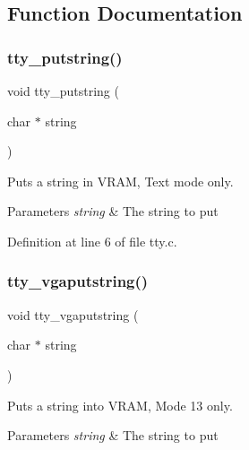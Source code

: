 \subsection{Function Documentation}
\mbox{\label{a00032_a2ebb962f457a2677d70285d1c0f9be12_a2ebb962f457a2677d70285d1c0f9be12}} 
\subsubsection{\texorpdfstring{tty\+\_\+putstring()}{tty\_putstring()}}
{\footnotesize\ttfamily void tty\+\_\+putstring (\begin{DoxyParamCaption}\item[{char $\ast$}]{string }\end{DoxyParamCaption})}



Puts a string in V\+R\+AM, Text mode only. 


\begin{DoxyParams}{Parameters}
{\em string} & The string to put \\
\hline
\end{DoxyParams}


Definition at line 6 of file tty.\+c.

\mbox{\label{a00032_a13ff2c06d56753c5666ca56cb2d81100_a13ff2c06d56753c5666ca56cb2d81100}} 
\subsubsection{\texorpdfstring{tty\+\_\+vgaputstring()}{tty\_vgaputstring()}}
{\footnotesize\ttfamily void tty\+\_\+vgaputstring (\begin{DoxyParamCaption}\item[{char $\ast$}]{string }\end{DoxyParamCaption})}



Puts a string into V\+R\+AM, Mode 13 only. 


\begin{DoxyParams}{Parameters}
{\em string} & The string to put \\
\hline
\end{DoxyParams}


